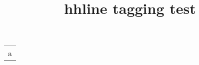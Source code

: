 \documentclass{article}
\title{hhline tagging test}
\begin{document}
\begin{tabular}{l}
\hhline{=}
a
\end{tabular}
\end{document}

